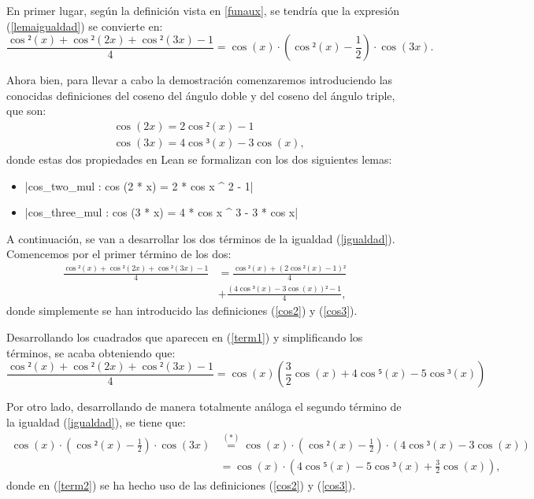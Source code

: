 \begin{demostracion}
  En primer lugar, según la definición vista en \ref{funaux}, se
  tendría que la expresión (\ref{lemaigualdad}) se convierte en:
  \begin{equation}\label{igualdad}
    \frac{\cos²(x)+\cos²(2x)+\cos²(3x)-1}{4}=
    \cos(x)·\left(\cos²(x)-\frac{1}{2}\right)·\cos(3x).
  \end{equation}

  Ahora bien, para llevar a cabo la demostración comenzaremos
  introduciendo las conocidas definiciones del coseno del ángulo doble y
  del coseno del ángulo triple, que son:
  \begin{align}
    & \cos(2x)=2\cos²(x)-1\label{cos2}\\
    & \cos(3x)=4\cos³(x)-3\cos(x)\label{cos3},
  \end{align}
  donde estas dos propiedades en Lean se formalizan con los dos
  siguientes lemas:
  \begin{itemize}
\item {}|cos_two_mul : cos (2 * x) = 2 * cos x ^ 2 - 1|
\item {}|cos_three_mul : cos (3 * x) = 4 * cos x ^ 3 - 3 * cos x|
\end{itemize}

A continuación, se van a desarrollar los dos términos de la igualdad
(\ref{igualdad}). Comencemos por el primer término de los dos:
\begin{align}\label{term1}
  \frac{\cos²(x)+\cos²(2x)+\cos²(3x)-1}{4}&=\frac{\cos²(x)+(2\cos²(x)-1)²}{4}\\
  &+\frac{(4\cos³(x)-3\cos(x))²-1}{4},
\end{align}
donde simplemente se han introducido las definiciones (\ref{cos2})
y (\ref{cos3}).

Desarrollando los cuadrados que aparecen en (\ref{term1}) y
simplificando los términos, se acaba obteniendo que:
\begin{equation}\label{term11}
  \frac{\cos²(x)+\cos²(2x)+\cos²(3x)-1}{4}=
  \cos(x)\left(\frac{3}{2}\cos(x)+4\cos⁵(x)-5\cos³(x)\right)
\end{equation}

Por otro lado, desarrollando de manera totalmente análoga el
segundo término de la igualdad (\ref{igualdad}), se tiene que:
\begin{align}
  \cos(x)·\left(\cos²(x)-\frac{1}{2}\right)·\cos(3x)
                                         &\stackrel{(*)}{=}\cos(x)·
                                           \left(\cos²(x)-\frac{1}{2}\right)·
                                           (4\cos³(x)-3\cos(x)
                                           )\label{term2}\\
                                         &=\cos(x)·
                                           \left(4\cos⁵(x)-5\cos³(x)
                                           +\frac{3}{2}\cos(x)\right)
                                           \label{term21},
\end{align}
donde en (\ref{term2}) se ha hecho uso de las definiciones (\ref{cos2})
y (\ref{cos3}).


\end{demostracion}
